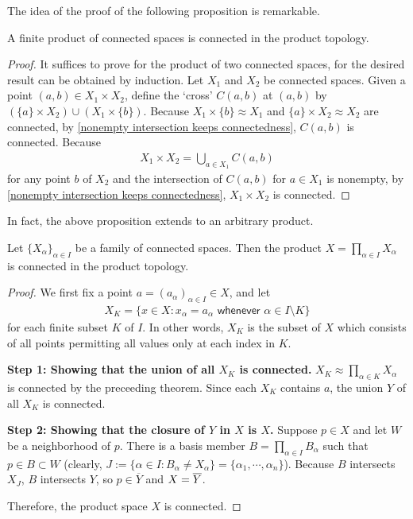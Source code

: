 The idea of the proof of the following proposition is remarkable.
\begin{thm}
    A finite product of connected spaces is connected in the product topology.
\end{thm}
\begin{proof}
    It suffices to prove for the product of two connected spaces, for the desired result can be obtained by induction.
    Let $X_1$ and $X_2$ be connected spaces.
    Given a point $(a, b)\in X_1\times X_2$, define the `cross' $C(a, b)$ at $(a, b)$ by $(\{a\}\times X_2)\cup(X_1\times\{b\})$.
    Because $X_1\times\{b\}\approx X_1$ and $\{a\}\times X_2\approx X_2$ are connected, by \cref{nonempty intersection keeps connectedness}, $C(a, b)$ is connected.
    Because
    \begin{align*}
        X_1\times X_2=\bigcup_{a\in X_1}C(a, b)
    \end{align*}
    for any point $b$ of $X_2$ and the intersection of $C(a, b)$ for $a\in X_1$ is nonempty, by \cref{nonempty intersection keeps connectedness}, $X_1\times X_2$ is connected.
\end{proof}

In fact, the above proposition extends to an arbitrary product.
\begin{thm}
    Let $\{X_\alpha\}_{\alpha\in I}$ be a family of connected spaces.
    Then the product $X=\prod_{\alpha\in I}X_\alpha$ is connected in the product topology.
\end{thm}
\begin{proof}
    We first fix a point $a=(a_\alpha)_{\alpha\in I}\in X$, and let
    \begin{align*}
        X_K=\{x\in X
        :
        x_\alpha=a_\alpha\textsf{ whenever }\alpha\in I\setminus K
        \}
    \end{align*}
    for each finite subset $K$ of $I$.
    In other words, $X_K$ is the subset of $X$ which consists of all points permitting all values only at each index in $K$.

    \textbf{Step 1: Showing that the union of all $X_K$ is connected.}\newline\noindent
    $X_K\approx\prod_{\alpha\in K}X_\alpha$ is connected by the preceeding theorem.
    Since each $X_K$ contains $a$, the union $Y$ of all $X_K$ is connected.

    \textbf{Step 2: Showing that the closure of $Y$ in $X$ is $X$.}\newline\noindent
    Suppose $p\in X$ and let $W$ be a neighborhood of $p$.
    There is a basis member $B=\prod_{\alpha\in I} B_\alpha$ such that $p\in B\subset W$ (clearly, $J:=\{\alpha\in I: B_\alpha\neq X_\alpha\}=\{\alpha_1, \cdots, \alpha_n\}$).
    Because $B$ intersects $X_J$, $B$ intersects $Y$, so $p\in\overline{Y}$ and $X=\overline{Y}$.

    Therefore, the product space $X$ is connected.
\end{proof}


